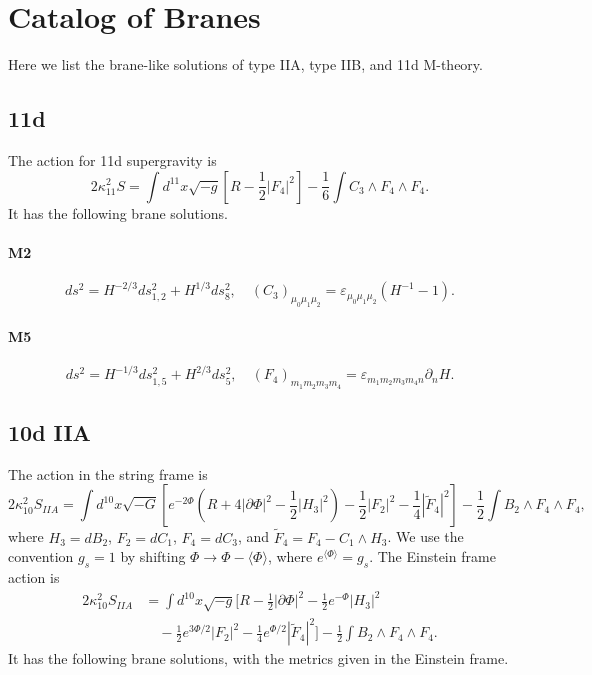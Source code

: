 \section{Catalog of Branes}
\label{sec:catalog-of-branes}
Here we list the brane-like solutions of type IIA, type IIB, and 11d M-theory.

\subsection*{11d}

The action for 11d supergravity is
\begin{equation}
2\kappa_{11}^2 S = 
\int d^{11}x\sqrt{-g}\left[
    R-\frac{1}{2}| F_4|^2
\right]
-\frac{1}{6}\int  C_3 \wedge  F_4 \wedge  F_4.
\end{equation}
It has the following brane solutions.
\paragraph{M2}
\begin{equation}
ds^2 = H^{-2/3}ds_{1,2}^2 + H^{1/3}ds_8^2,\quad
(C_3)_{\mu_0 \mu_1 \mu_2} = \varepsilon_{\mu_0 \mu_1 \mu_2}(H^{-1}-1).
\end{equation}

\paragraph{M5}
\begin{equation}
ds^2 = H^{-1/3}ds_{1,5}^2 + H^{2/3}ds_5^2,\quad
(F_4)_{m_1 m_2 m_3 m_4} = \varepsilon_{m_1 m_2 m_3 m_4 n} \partial_n H.
\end{equation}

\subsection*{10d IIA}

The action in the string frame is
\begin{equation}
2\kappa_{10}^2 S_{IIA} =
\int d^{10}x\sqrt{-G}\left[
    e^{-2\Phi}\left(R+4|\partial\Phi|^2-\frac{1}{2}|H_3|^2\right)
    -\frac{1}{2}|F_2|^2-\frac{1}{4}|\tilde{F}_4|^2
\right]
-\frac{1}{2}\int B_2 \wedge F_4 \wedge F_4,
\end{equation}
where $H_3 = dB_2$, $F_2 = dC_1$, $F_4 = dC_3$, and $\tilde{F}_4 = F_4 - C_1 \wedge H_3$.
We use the convention $g_s = 1$ by shifting $\Phi \to \Phi - \langle\Phi\rangle$, where $e^{\langle\Phi\rangle} = g_s$.
The Einstein frame action is
\begin{equation}
\begin{aligned}
2\kappa_{10}^2 S_{IIA}
&= \int d^{10}x\sqrt{-g}\Bigg[
    R - \frac{1}{2}|\partial\Phi|^2 - \frac{1}{2}e^{-\Phi}|H_3|^2 \\
    &\quad - \frac{1}{2}e^{3\Phi/2}|F_2|^2 - \frac{1}{4}e^{\Phi/2}|\tilde{F}_4|^2
\Bigg]
- \frac{1}{2}\int B_2 \wedge F_4 \wedge F_4.
\end{aligned}
\end{equation}
It has the following brane solutions, with the metrics given in the Einstein frame.

